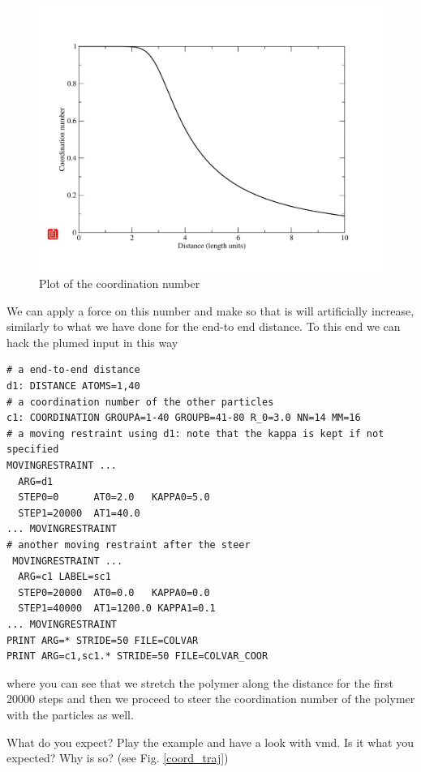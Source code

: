 \documentclass[10pt,fleqn,a4paper]{report}
\begin{document}
\begin{figure}[h!]
\begin{center}
\includegraphics[width=12cm,angle=0]{./figures/coordination_plot}
\caption{Plot of the coordination number}
\label{coordination}
\end{center}
\end{figure} 

We can apply a force on this number and make so that is will artificially increase, similarly to what we have done for the end-to end distance. 
To this end we can hack the plumed input in this way

\begin{verbatim}
# a end-to-end distance
d1: DISTANCE ATOMS=1,40
# a coordination number of the other particles
c1: COORDINATION GROUPA=1-40 GROUPB=41-80 R_0=3.0 NN=14 MM=16
# a moving restraint using d1: note that the kappa is kept if not specified
MOVINGRESTRAINT ...
  ARG=d1
  STEP0=0      AT0=2.0   KAPPA0=5.0
  STEP1=20000  AT1=40.0
... MOVINGRESTRAINT
# another moving restraint after the steer
 MOVINGRESTRAINT ...
  ARG=c1 LABEL=sc1
  STEP0=20000  AT0=0.0   KAPPA0=0.0
  STEP1=40000  AT1=1200.0 KAPPA1=0.1
... MOVINGRESTRAINT
PRINT ARG=* STRIDE=50 FILE=COLVAR
PRINT ARG=c1,sc1.* STRIDE=50 FILE=COLVAR_COOR
\end{verbatim}
where you can see that we stretch the polymer along the distance for the first 20000 steps and then we proceed to steer the coordination number of the polymer with the particles as well.

What do you expect? Play the example and have a look with vmd. Is it what you expected? Why is so? (see Fig.  \ref{coord_traj})
\end{document}
